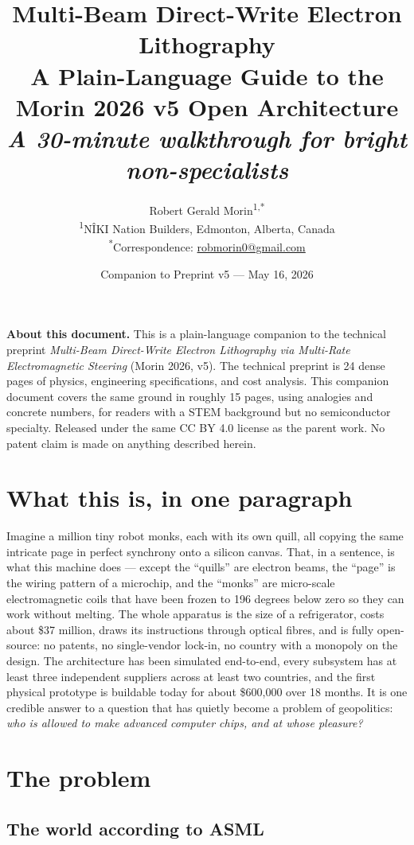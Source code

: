 \documentclass[11pt,letterpaper]{article}
\title{\Large \textbf{Multi-Beam Direct-Write Electron Lithography}\\[0.3em]
  \large A Plain-Language Guide to the Morin 2026 v5 Open Architecture\\[0.2em]
  \normalsize \textit{A 30-minute walkthrough for bright non-specialists}}
\author{Robert Gerald Morin\textsuperscript{1,*}\\[0.4em]
  {\small \textsuperscript{1}N\^{I}KI Nation Builders, Edmonton, Alberta, Canada}\\
  {\small \textsuperscript{*}Correspondence: \href{mailto:robmorin0@gmail.com}{robmorin0@gmail.com}}}
\date{Companion to Preprint v5 --- May 16, 2026}
\begin{document}
\maketitle
\thispagestyle{fancy}

\begin{mdframed}[linewidth=0.5pt,backgroundcolor=gray!4]
\textbf{About this document.} This is a plain-language companion to the technical preprint \emph{Multi-Beam Direct-Write Electron Lithography via Multi-Rate Electromagnetic Steering} (Morin 2026, v5). The technical preprint is 24 dense pages of physics, engineering specifications, and cost analysis. This companion document covers the same ground in roughly 15 pages, using analogies and concrete numbers, for readers with a STEM background but no semiconductor specialty. Released under the same CC BY 4.0 license as the parent work. No patent claim is made on anything described herein.
\end{mdframed}

\section*{What this is, in one paragraph}

Imagine a million tiny robot monks, each with its own quill, all copying the same intricate page in perfect synchrony onto a silicon canvas. That, in a sentence, is what this machine does --- except the ``quills'' are electron beams, the ``page'' is the wiring pattern of a microchip, and the ``monks'' are micro-scale electromagnetic coils that have been frozen to 196 degrees below zero so they can work without melting. The whole apparatus is the size of a refrigerator, costs about \$37 million, draws its instructions through optical fibres, and is fully open-source: no patents, no single-vendor lock-in, no country with a monopoly on the design. The architecture has been simulated end-to-end, every subsystem has at least three independent suppliers across at least two countries, and the first physical prototype is buildable today for about \$600{,}000 over 18 months. It is one credible answer to a question that has quietly become a problem of geopolitics: \emph{who is allowed to make advanced computer chips, and at whose pleasure?}

\section{The problem}

\subsection{The world according to ASML}
\end{document}
